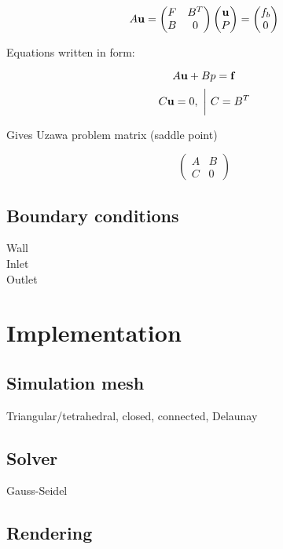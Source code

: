\documentclass[12pt]{article}
\newcommand{\vb}[1]{\text{\textbf{#1}}}
\begin{document}
$$
A \vb u = \begin{pmatrix}
  F & B^T \\
  B & 0
\end{pmatrix}
\begin{pmatrix}
  \vb u \\
  P
\end{pmatrix} =
\begin{pmatrix}
  f_b \\
  0
  \end{pmatrix}
  $$

  Equations written in form:

  $$
  A \vb u + B p = \vb f
  $$
  $$
  C \vb u = 0, \ \bigg| \ C = B^T
  $$

  Gives Uzawa problem matrix (saddle point)

  $$
  \begin{pmatrix}
    A & B \\
    C & 0
    \end{pmatrix}
  $$

\subsection{Boundary conditions}

\noindent

Wall\\

Inlet\\

Outlet\\

\section{Implementation}

\subsection{Simulation mesh}

Triangular/tetrahedral, closed, connected, Delaunay

\subsection{Solver}

Gauss-Seidel

\subsection{Rendering}
\end{document}
